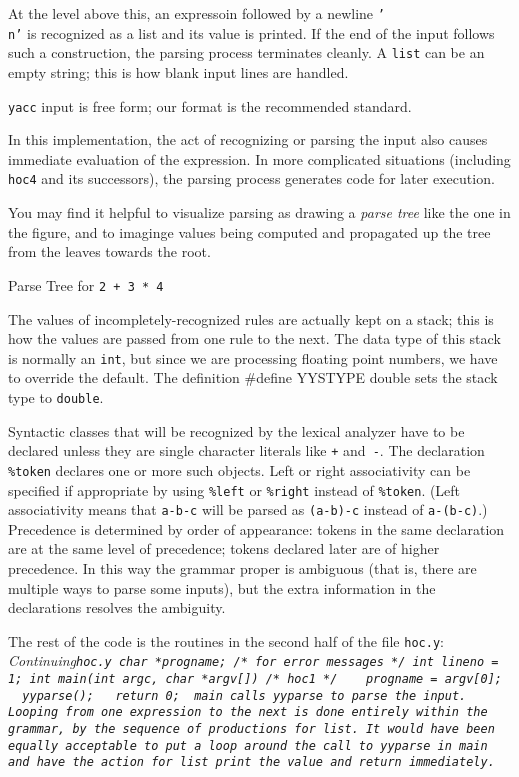 {At the level above this, an expressoin followed by a newline
{\tt'\\n'} is recognized as a list and its value is printed.
If the end of the input follows such a construction, the parsing
process terminates cleanly. A {\tt list} can be an empty string;
this is how blank input lines are handled.

{\tt yacc} input is free form; our format is the recommended standard.

In this implementation, the act of recognizing or parsing the input
also causes immediate evaluation of the expression. In more
complicated situations (including {\tt hoc4} and its successors),
the parsing process generates code for later execution.

You may find it helpful to visualize parsing as drawing a
{\it parse tree\/} like the one in the figure, and to imaginge
values being computed and propagated up the tree from the leaves
towards the root.
\medskip
\centerline{}
\centerline{Parse Tree for {\tt 2 + 3 * 4}}
\medskip
\noindent
The values of incompletely-recognized rules are actually kept
on a stack; this is how the values are passed from one rule
to the next. The data type of this stack is normally an {\tt int},
but since we are processing floating point numbers, we have to
override the default. The definition
\begincode
#define YYSTYPE double
\endcode\noindent
sets the stack type to {\tt double}.

Syntactic classes that will be recognized by the lexical analyzer
have to be declared unless they are single character literals like
{\tt+} and~{\tt-}. The declaration {\tt\%token} declares one or
more such objects. Left or right associativity can be specified
if appropriate by using {\tt\%left} or {\tt\%right} instead of
{\tt\%token}. (Left associativity means that {\tt a-b-c} will
be parsed as {\tt(a-b)-c} instead of {\tt a-(b-c)}.)
Precedence is determined by order of appearance: tokens
in the same declaration are at the same level of precedence;
tokens declared later are of higher precedence. In this way
the grammar proper is ambiguous (that is, there are multiple
ways to parse some inputs), but the extra information in the
declarations resolves the ambiguity.

The rest of the code is the routines in the second half of the
file {\tt hoc.y}:
\begincode
~                       \it Continuing\/\tt hoc.y
char    *progname;       /* for error messages */
int     lineno = 1;
\medskip
int main(int argc, char *argv[])   /* hoc1 */
{
~       progname = argv[0];
~       yyparse();
~       return 0;
}
\endcode
\noindent
{\tt main} calls {\tt yyparse} to parse the input. Looping from
one expression to the next is done entirely within the grammar,
by the sequence of productions for {\tt list}. It would have been
equally acceptable to put a loop around the call to {\tt yyparse}
in {\tt main} and have the action for {\tt list} print the value
and return immediately.

}
